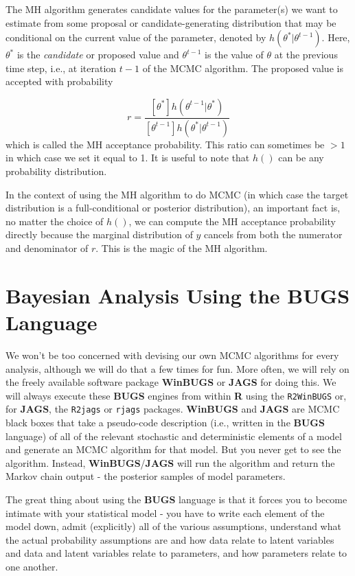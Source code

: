 The MH algorithm generates candidate values for the parameter(s) we want to estimate from some
proposal or candidate-generating distribution that may be conditional
on the current value of the parameter, denoted by
$h(\theta^{*}|\theta^{t-1})$. Here, $\theta^{*}$ is the {\it candidate}
or proposed
value and $\theta^{t-1}$ is the value of $\theta$ at the previous time step, i.e., at iteration $t-1$ of
the MCMC algorithm.  The proposed value
is accepted with probability

\[
r = \frac{ [\theta^{*}] h(\theta^{t-1}|\theta^{*})}
    { [\theta^{t-1}] h(\theta^{*}|\theta^{t-1}) }
\]
which is called the MH acceptance probability.
This ratio can sometimes be $>1$ in which case we set it equal to
1. It is useful to note that $h()$ can be any probability distribution.


In the context of using the MH algorithm to do MCMC (in which case
the target distribution is a full-conditional or posterior distribution), an
important fact is, no matter
the choice of $h()$, we can compute the MH acceptance probability
directly because 
the marginal distribution of $y$ cancels from both the numerator and
denominator of $r$. This is the magic of the MH algorithm.


\section{Bayesian Analysis Using the BUGS Language}

We won't be too concerned with devising our own MCMC algorithms for
every analysis, although we will do that a few times for fun.  More
often, we will rely on the freely available software package {\bf
  WinBUGS} or {\bf JAGS} for doing this.  We will always execute these
{\bf BUGS} engines from within {\bf R} using the \mbox{\tt R2WinBUGS}
\citep{sturtz_etal:2005} or, for {\bf JAGS}, the \mbox{\tt R2jags}
\citep{su_yajima:2011} or \mbox{\tt rjags} \citep{plummer:2009}
packages.  {\bf WinBUGS} and {\bf JAGS} are MCMC black boxes that take
a pseudo-code description (i.e., written in the {\bf BUGS} language)
of all of the relevant stochastic and deterministic elements of a
model and generate an MCMC algorithm for that model. But you never get
to see the algorithm. Instead, {\bf WinBUGS}/{\bf JAGS} will run the
algorithm and return the Markov chain output - the posterior samples
of model parameters.

The great thing about using the {\bf BUGS} language is that it forces
you to become intimate with your statistical model - you have to write
each element of the model down, admit (explicitly) all of the various
assumptions, understand what the actual probability assumptions are
and how data relate to latent variables and data and latent variables
relate to parameters, and how parameters relate to one another.


